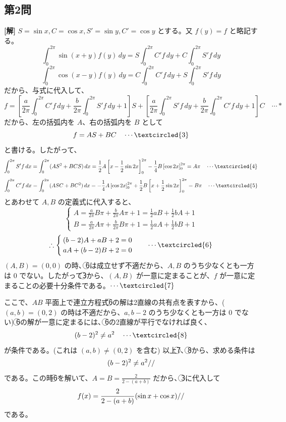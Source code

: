 \documentclass[../main.tex]{subfiles}
\begin{document}
\bigskip

\subsection*{第2問}

\noindent
\textbf{[解]} $S = \sin x, C = \cos x, S' = \sin y, C' = \cos y$ とする。又 $f(y) = f$ と略記する。
\[
  \int_0^{2\pi} \sin(x+y) f(y) \, dy = S \int_0^{2\pi} C' f \, dy + C \int_0^{2\pi} S' f \, dy
\]
\[
  \int_0^{2\pi} \cos(x-y) f(y) \, dy = C \int_0^{2\pi} C' f \, dy + S \int_0^{2\pi} S' f \, dy
\]
だから、与式に代入して、
\[
  f = \left[ \frac{a}{2\pi} \int_0^{2\pi} C' f \, dy + \frac{b}{2\pi} \int_0^{2\pi} S' f \, dy + 1 \right] S + \left[ \frac{a}{2\pi} \int_0^{2\pi} S' f \, dy + \frac{b}{2\pi} \int_0^{2\pi} C' f \, dy + 1 \right] C \quad \cdots *
\]
だから、左の括弧内を $A$、右の括弧内を $B$ として
\[
  f = A S + B C \quad \cdots \textcircled{3}
\]
と書ける。したがって、
\[
  \int_0^{2\pi} S' f \, dx = \int_0^{2\pi} (A S^2 + B C S) \, dx = \frac{1}{2} A \left[ x - \frac{1}{2}\sin 2x \right]_0^{2\pi} - \frac{1}{4} B \left[ \cos 2x \right]_0^{2\pi} = A \pi \quad \cdots \textcircled{4}
\]
\[
  \int_0^{2\pi} C' f \, dx = \int_0^{2\pi} (A S C + B C^2) \, dx = -\frac{1}{4} A \left[ \cos 2x \right]_0^{2\pi} + \frac{1}{2} B \left[ x + \frac{1}{2}\sin 2x \right]_0^{2\pi} = B \pi \quad \cdots \textcircled{5}
\]
とあわせて $A, B$ の定義式に代入すると、
\[
  \begin{cases}
    A = \frac{a}{2\pi} B \pi + \frac{b}{2\pi} A \pi + 1 = \frac{1}{2} a B + \frac{1}{2} b A + 1 \\
    B = \frac{a}{2\pi} A \pi + \frac{b}{2\pi} B \pi + 1 = \frac{1}{2} a A + \frac{1}{2} b B + 1
  \end{cases}
\]
\[
  \therefore
  \begin{cases}
    (b-2)A + aB + 2 = 0 \\
    aA + (b-2)B + 2 = 0
  \end{cases}
  \quad \cdots \textcircled{6}
\]
$(A,B) = (0,0)$ の時、\textcircled{6}は成立せず不適だから、$A, B$ のうち少なくとも一方は $0$ でない。したがって\textcircled{3}から、$(A,B)$ が一意に定まることが、$f$ が一意に定まることの必要十分条件である。$\cdots \textcircled{7}$

ここで、$AB$ 平面上で連立方程式\textcircled{6}の解は2直線の共有点を表すから、($(a,b) = (0,2)$ の時は不適だから、$a, b-2$ のうち少なくとも一方は $0$ でない)
\textcircled{6}の解が一意に定まるには、\textcircled{6}の2直線が平行でなければ良く、
\[
  (b-2)^2 \neq a^2 \quad \cdots \textcircled{8}
\]
が条件である。(これは $(a,b) \neq (0,2)$ を含む) 以上\textcircled{7}、\textcircled{8}から、求める条件は
\[
  (b-2)^2 \neq a^2 \hfill \text{\slash\slash}
\]
である。この時\textcircled{6}を解いて、$A = B = \frac{2}{2-(a+b)}$ だから、\textcircled{3}に代入して
\[
  f(x) = \frac{2}{2-(a+b)} (\sin x + \cos x) \hfill \text{\slash\slash}
\]
である。
\end{document}
